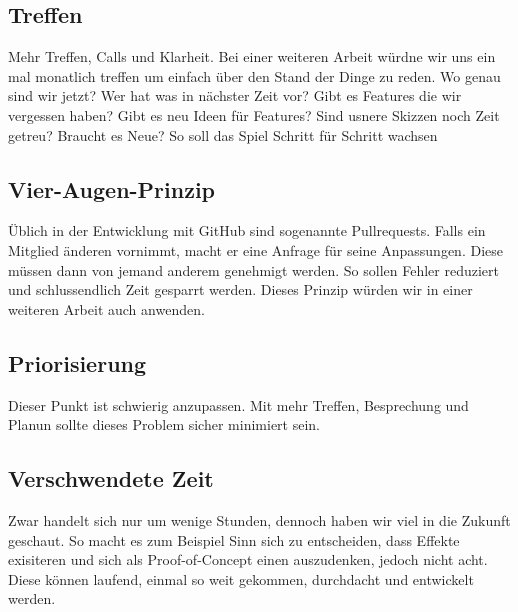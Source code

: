 \subsection*{Treffen}
Mehr Treffen, Calls und Klarheit.
Bei einer weiteren Arbeit würdne wir uns ein mal monatlich treffen um einfach über den Stand der Dinge zu reden.
Wo genau sind wir jetzt?
Wer hat was in nächster Zeit vor?
Gibt es Features die wir vergessen haben?
Gibt es neu Ideen für Features?
Sind usnere Skizzen noch Zeit getreu?
Braucht es Neue?
So soll das Spiel Schritt für Schritt wachsen

\subsection*{Vier-Augen-Prinzip}
Üblich in der Entwicklung mit GitHub sind sogenannte Pullrequests.
Falls ein Mitglied änderen vornimmt, macht er eine Anfrage für seine Anpassungen.
Diese müssen dann von jemand anderem genehmigt werden.
So sollen Fehler reduziert und schlussendlich Zeit gesparrt werden.
Dieses Prinzip würden wir in einer weiteren Arbeit auch anwenden.

\subsection*{Priorisierung}
Dieser Punkt ist schwierig anzupassen.
Mit mehr Treffen, Besprechung und Planun sollte dieses Problem sicher minimiert sein.

\subsection*{Verschwendete Zeit}
Zwar handelt sich nur um wenige Stunden, dennoch haben wir viel in die Zukunft geschaut.
So macht es zum Beispiel Sinn sich zu entscheiden, dass Effekte exisiteren und sich als Proof-of-Concept einen auszudenken, jedoch nicht acht.
Diese können laufend, einmal so weit gekommen, durchdacht und entwickelt werden.